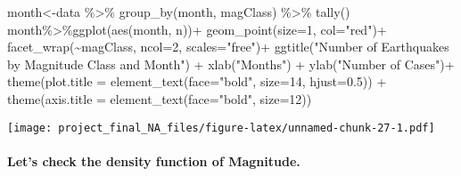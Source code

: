 \documentclass[
]{article}
\newenvironment{Shaded}{\begin{snugshade}}{\end{snugshade}}
\newcommand{\AttributeTok}[1]{\textcolor[rgb]{0.77,0.63,0.00}{#1}}
\newcommand{\DecValTok}[1]{\textcolor[rgb]{0.00,0.00,0.81}{#1}}
\newcommand{\FloatTok}[1]{\textcolor[rgb]{0.00,0.00,0.81}{#1}}
\newcommand{\FunctionTok}[1]{\textcolor[rgb]{0.00,0.00,0.00}{#1}}
\newcommand{\NormalTok}[1]{#1}
\newcommand{\OtherTok}[1]{\textcolor[rgb]{0.56,0.35,0.01}{#1}}
\newcommand{\SpecialCharTok}[1]{\textcolor[rgb]{0.00,0.00,0.00}{#1}}
\newcommand{\StringTok}[1]{\textcolor[rgb]{0.31,0.60,0.02}{#1}}
\begin{document}
\begin{Shaded}
\begin{Highlighting}[]
\NormalTok{month}\OtherTok{\textless{}{-}}\NormalTok{data }\SpecialCharTok{\%\textgreater{}\%} \FunctionTok{group\_by}\NormalTok{(month, magClass) }\SpecialCharTok{\%\textgreater{}\%} \FunctionTok{tally}\NormalTok{()}
\NormalTok{month}\SpecialCharTok{\%\textgreater{}\%}\FunctionTok{ggplot}\NormalTok{(}\FunctionTok{aes}\NormalTok{(month, n))}\SpecialCharTok{+}
\FunctionTok{geom\_point}\NormalTok{(}\AttributeTok{size=}\DecValTok{1}\NormalTok{, }\AttributeTok{col=}\StringTok{"red"}\NormalTok{)}\SpecialCharTok{+}
  \FunctionTok{facet\_wrap}\NormalTok{(}\SpecialCharTok{\textasciitilde{}}\NormalTok{magClass,  }\AttributeTok{ncol=}\DecValTok{2}\NormalTok{, }\AttributeTok{scales=}\StringTok{"free"}\NormalTok{)}\SpecialCharTok{+}
   \FunctionTok{ggtitle}\NormalTok{(}\StringTok{"Number of Earthquakes by Magnitude Class and Month"}\NormalTok{) }\SpecialCharTok{+}
           \FunctionTok{xlab}\NormalTok{(}\StringTok{"Months"}\NormalTok{) }\SpecialCharTok{+} \FunctionTok{ylab}\NormalTok{(}\StringTok{"Number of Cases"}\NormalTok{)}\SpecialCharTok{+}
  \FunctionTok{theme}\NormalTok{(}\AttributeTok{plot.title =} \FunctionTok{element\_text}\NormalTok{(}\AttributeTok{face=}\StringTok{"bold"}\NormalTok{, }\AttributeTok{size=}\DecValTok{14}\NormalTok{, }\AttributeTok{hjust=}\FloatTok{0.5}\NormalTok{)) }\SpecialCharTok{+}
\FunctionTok{theme}\NormalTok{(}\AttributeTok{axis.title =} \FunctionTok{element\_text}\NormalTok{(}\AttributeTok{face=}\StringTok{"bold"}\NormalTok{, }\AttributeTok{size=}\DecValTok{12}\NormalTok{))}
\end{Highlighting}
\end{Shaded}

\texttt{[image: project\_final\_NA\_files/figure-latex/unnamed-chunk-27-1.pdf]}

\hypertarget{lets-check-the-density-function-of-magnitude.}{%
\paragraph{Let's check the density function of
Magnitude.}\label{lets-check-the-density-function-of-magnitude.}}

\begin{Shaded}
\end{Shaded}
\end{document}
